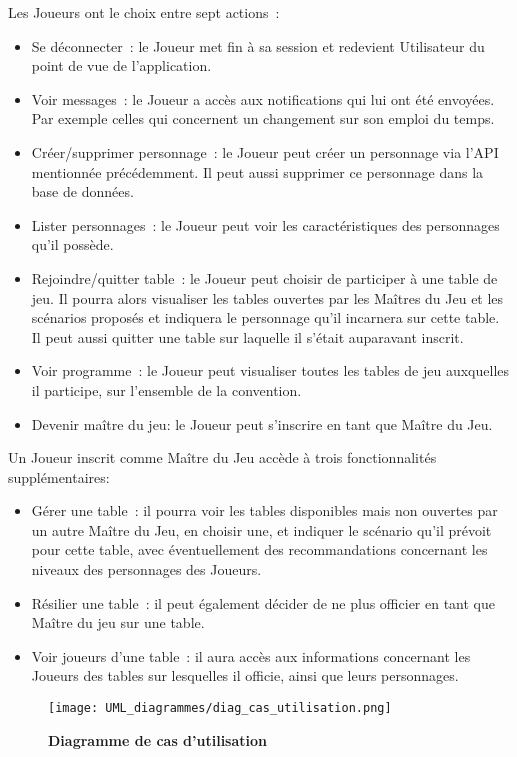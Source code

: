 \documentclass[11pt]{article}
\begin{document}
Les Joueurs ont le choix entre sept actions~:
\begin{itemize}
    \item {Se déconnecter~: le Joueur met fin à sa session et redevient Utilisateur du point de vue de l'application.}
    \item{Voir messages~: le Joueur a accès aux notifications qui lui ont été envoyées. Par exemple celles qui concernent un changement sur son emploi du temps.}
    \item{Créer/supprimer personnage~: le Joueur peut créer un personnage via l'API mentionnée précédemment. Il peut aussi supprimer ce personnage dans la base de données.}
    \item{Lister personnages~: le Joueur peut voir les caractéristiques des personnages qu'il possède.}
    \item{Rejoindre/quitter table~: le Joueur peut choisir de participer à une table de jeu. Il pourra alors visualiser les tables ouvertes par les Maîtres du Jeu et les scénarios proposés et indiquera le personnage qu'il incarnera sur cette table. Il peut aussi quitter une table sur laquelle il s'était auparavant inscrit.}
    \item{Voir programme~: le Joueur peut visualiser toutes les tables de jeu auxquelles il participe, sur l'ensemble de la convention.}
    \item{Devenir maître du jeu: le Joueur peut s'inscrire en tant que Maître du Jeu.\\}
\end{itemize}

Un Joueur inscrit comme Maître du Jeu accède à trois fonctionnalités supplémentaires:
\begin{itemize}
    \item{Gérer une table~: il pourra voir les tables disponibles mais non ouvertes par un autre Maître du Jeu, en choisir une, et indiquer le scénario qu'il prévoit pour cette table, avec éventuellement des recommandations concernant les niveaux des personnages des Joueurs.}
    \item{Résilier une table~: il peut également décider de ne plus officier en tant que Maître du jeu sur une table.}
    \item{Voir joueurs d'une table~: il aura accès aux informations concernant les Joueurs des tables sur lesquelles il officie, ainsi que leurs personnages.\\}
\end{itemize}

\begin{figure}[H]
    \caption{\textbf{Diagramme de cas d'utilisation}}
    \label{UML_classe_pipeline}
    \centering
    \texttt{[image: UML\_diagrammes/diag\_cas\_utilisation.png]}
\end{figure}
\end{document}
